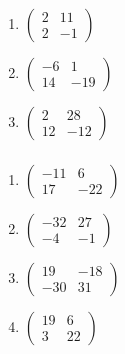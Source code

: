 \documentclass{article}
\begin{document}
\setcounter{subsubsection}{14}
\subsubsection{}

\begin{enumerate}
  \item $\begin{pmatrix}
            2 & 11 \\
            2 & -1
          \end{pmatrix}$

  \item $\begin{pmatrix}
            -6 & 1   \\
            14 & -19
          \end{pmatrix}$

  \item $\begin{pmatrix}
            2  & 28  \\
            12 & -12
          \end{pmatrix}$
\end{enumerate}

\setcounter{subsubsection}{16}
\subsubsection{}

\begin{enumerate}
  \item $\begin{pmatrix}
            -11 & 6   \\
            17  & -22
          \end{pmatrix}$

  \item $\begin{pmatrix}
            -32 & 27 \\
            -4  & -1
          \end{pmatrix}$

  \item $\begin{pmatrix}
            19  & -18 \\
            -30 & 31
          \end{pmatrix}$

  \item $\begin{pmatrix}
            19 & 6  \\
            3  & 22
          \end{pmatrix}$
\end{enumerate}
\end{document}

